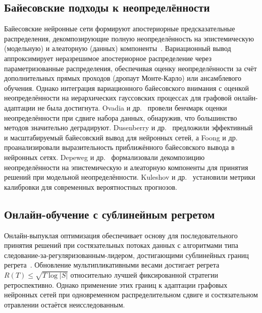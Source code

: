 \subsection{Байесовские подходы к неопределённости}

Байесовские нейронные сети формируют апостериорные предсказательные распределения, декомпозирующие полную неопределённость на эпистемическую (модельную) и алеаторную (данных) компоненты~\cite{Gal2016,Blundell2015,Lakshminarayanan2017,Kendall2017}. Вариационный вывод аппроксимирует неразрешимое апостериорное распределение через параметризованные распределения, обеспечивая оценку неопределённости за счёт дополнительных прямых проходов (дропаут Монте-Карло) или ансамблевого обучения. Однако интеграция вариационного байесовского внимания с оценкой неопределённости на иерархических гауссовских процессах для графовой онлайн-адаптации не была достигнута. Ovadia и др.~\cite{Ovadia2019} провели бенчмарк оценки неопределённости при сдвиге набора данных, обнаружив, что большинство методов значительно деградируют. Dusenberry и др.~\cite{Dusenberry2020} предложили эффективный и масштабируемый байесовский вывод для нейронных сетей, а Foong и др.~\cite{Foong2019} проанализировали выразительность приближённого байесовского вывода в нейронных сетях. Depeweg и др.~\cite{Depeweg2018} формализовали декомпозицию неопределённости на эпистемическую и алеаторную компоненты для принятия решений при модельной неопределённости. Kuleshov и др.~\cite{Kuleshov2018} установили метрики калибровки для современных вероятностных прогнозов.


\subsection{Онлайн-обучение с сублинейным регретом}

Онлайн-выпуклая оптимизация обеспечивает основу для последовательного принятия решений при состязательных потоках данных с алгоритмами типа следование-за-регуляризованным-лидером, достигающими сублинейных границ регрета~\cite{Shalev2012,Arjovsky2017}. Обновление мультипликативными весами достигает регрета $R(T)\leq\sqrt{T\log|S|}$ относительно лучшей фиксированной стратегии ретроспективно. Однако применение этих границ к адаптации графовых нейронных сетей при одновременном распределительном сдвиге и состязательном отравлении остаётся неисследованным.

